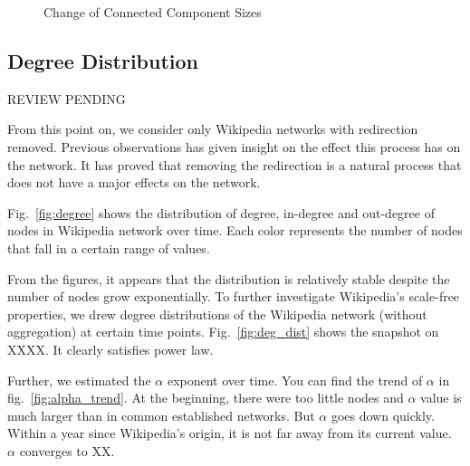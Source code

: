 \documentclass[10pt]{article}
\begin{document}
\begin{multicols}{2}
\begin{figure}[H]
\caption{Change of Connected Component Sizes \label{fig:cc}}
\end{figure}

\subsection{Degree Distribution}

REVIEW PENDING

From this point on, we consider only Wikipedia networks with redirection removed. Previous observations has given insight on the effect this process has on the network. It has proved that removing the redirection is a natural process that does not have a major effects on the network.

Fig.~\ref{fig:degree} shows the distribution of degree, in-degree and out-degree of nodes in Wikipedia network over time. Each color represents the number of nodes that fall in a certain range of values. 

From the figures, it appears that the distribution is relatively stable despite the number of nodes grow exponentially. To further investigate Wikipedia's scale-free properties, we drew degree distributions of the Wikipedia network (without aggregation) at certain time points. Fig.~\ref{fig:deg_dist} shows the snapshot on XXXX. It clearly satisfies power law. 

Further, we estimated the $\alpha$ exponent over time. You can find the trend of $\alpha$ in fig.~\ref{fig:alpha_trend}. At the beginning, there were too little nodes and $\alpha$ value is much larger than in common established networks. But $\alpha$ goes down quickly. Within a year since Wikipedia's origin, it is not far away from its current value. $\alpha$ converges to XX. 


\end{multicols}
\end{document}
